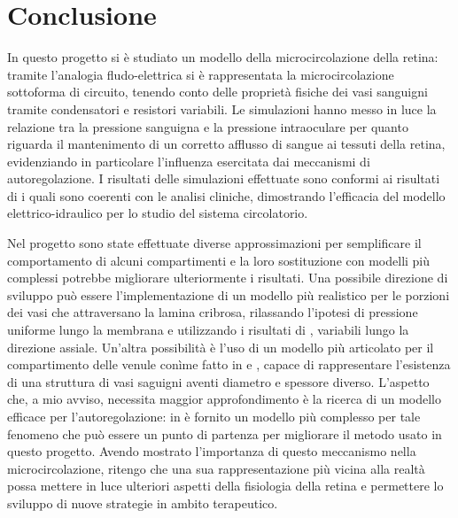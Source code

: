 \documentclass{article}
\begin{document}
\section{Conclusione}
In questo progetto si è studiato un modello della microcircolazione della retina: tramite l'analogia fludo-elettrica si è rappresentata la microcircolazione sottoforma di circuito, tenendo conto delle proprietà fisiche dei vasi sanguigni tramite condensatori e resistori variabili.
Le simulazioni hanno messo in luce la relazione tra la pressione sanguigna e la pressione intraoculare per quanto riguarda il mantenimento di un corretto afflusso di sangue  ai tessuti della retina, evidenziando in particolare l'influenza esercitata dai meccanismi di autoregolazione.
I risultati delle simulazioni effettuate sono conformi ai risultati di \cite{art1} i quali sono coerenti con le analisi cliniche, dimostrando l'efficacia del modello elettrico-idraulico per lo studio del sistema circolatorio.

Nel progetto sono state effettuate diverse approssimazioni per semplificare il comportamento di alcuni compartimenti e la loro sostituzione con modelli più complessi potrebbe migliorare ulteriormente i risultati.
Una possibile direzione di sviluppo può essere l'implementazione di un modello più realistico per le porzioni dei vasi che attraversano la lamina cribrosa, rilassando l'ipotesi di pressione uniforme lungo la membrana e utilizzando i risultati di \cite{art3}, variabili lungo la direzione assiale.
Un'altra possibilità è l'uso di un modello più articolato per il compartimento delle venule conìme fatto in \cite{art1} e \cite{Tesi}, capace di rappresentare l'esistenza di una struttura di vasi saguigni aventi diametro e spessore diverso.
L'aspetto che, a mio avviso, necessita maggior approfondimento è la ricerca di un modello efficace per l'autoregolazione: in \cite{Tesi} è fornito un modello più complesso per tale fenomeno che può essere un punto di partenza per migliorare il metodo usato in questo progetto.
Avendo mostrato l'importanza di questo meccanismo nella microcircolazione, ritengo che una sua rappresentazione più vicina alla realtà possa mettere in luce ulteriori aspetti della fisiologia della retina e permettere lo sviluppo di nuove strategie in ambito terapeutico.




\end{document}
